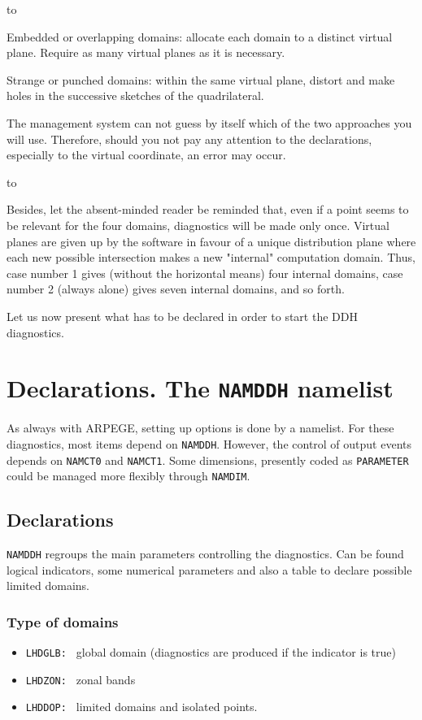 \ms
\hbox to \par Embedded or overlapping domains: allocate each domain to a distinct virtual plane. Require as many virtual planes as it is necessary.

Strange or punched domains: within the same virtual plane, distort and make holes in the successive sketches of the quadrilateral.

The management system can not guess by itself which of the two approaches you
will use. Therefore, should you not pay any attention to the declarations,
especially to the virtual coordinate, an error may occur.

\hbox to \hsize{\hrulefill}

\bigskip
Besides, let the absent-minded reader be reminded that, even if a point seems to
be relevant for the four domains, diagnostics will be
made only once. Virtual planes are given up by the software in favour of a
unique distribution plane where each new possible intersection makes a new
"internal" computation domain. Thus, case number 1 gives (without the horizontal
means) four internal domains, case number 2 (always alone) gives seven internal
domains, and so forth.

\ms Let us now present what has to be declared in order to start the DDH diagnostics.

\section{Declarations. The {\tt NAMDDH} namelist}

As always with ARPEGE, setting up options is done by a namelist.
For these diagnostics, most items depend on {\tt NAMDDH}. However, the control of output events depends on {\tt NAMCT0} and {\tt NAMCT1}. Some dimensions, presently coded as {\tt PARAMETER} could be managed more flexibly through {\tt NAMDIM}.
\subsection{Declarations} 

{\tt NAMDDH} regroups the main parameters controlling the diagnostics. Can be found logical indicators, some numerical parameters and also a table to declare possible limited domains.
\subsubsection{Type of domains}
\begin{itemize}
\item {\tt LHDGLB: } global domain (diagnostics are produced if the indicator is true)
\item {\tt LHDZON: } zonal bands
\item {\tt LHDDOP: } limited domains and isolated points.
\end{itemize}
